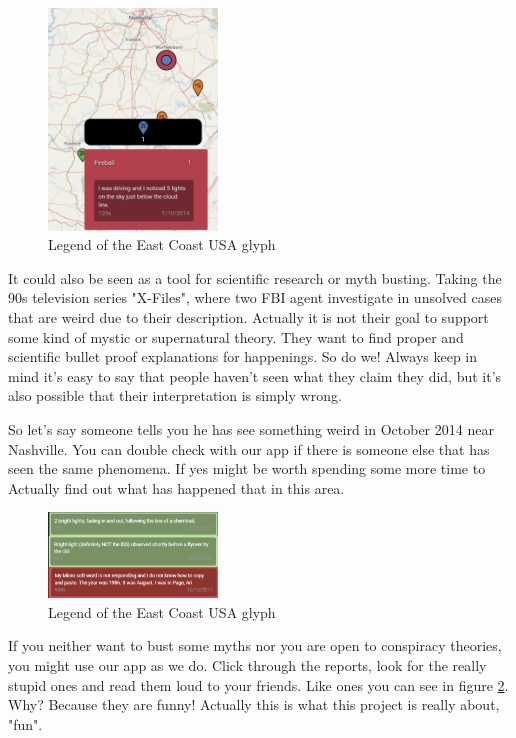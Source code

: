 \documentclass{article}
\begin{document}
\newpage

\begin{figure} 
    \centering
    \includegraphics[width=0.4\textwidth]{Tennesee}
    \caption{Legend of the East Coast USA glyph}
    \label{fig:Tennesee}
\end{figure}

It could also be seen as a tool for scientific research or myth busting. Taking the 90s television series "X-Files", where two FBI agent investigate in unsolved cases that are weird due to their description. Actually it is not their goal to support some kind of mystic or supernatural theory.
They want to find proper and scientific bullet proof explanations for happenings. So do we! Always keep in mind it's easy to say that people haven't seen what they claim they did, but it's also possible that their interpretation is simply wrong.

So let's say someone tells you he has see something weird in October 2014 near Nashville. You can double check with our app
if there is someone else that has seen the same phenomena. If yes might be worth spending some more time to Actually find out
what has happened that in this area.\\

\begin{figure} 
    \centering
    \includegraphics[width=0.4\textwidth]{funnyFindings}
    \caption{Legend of the East Coast USA glyph}
    \label{fig:funnyFindings}
\end{figure}

If you neither want to bust some myths nor you are open to conspiracy theories, 
you might use our app as we do. Click through the reports, look for the really 
stupid ones and read them loud to your friends. Like ones you can see in figure \ref{fig:funnyFindings}.
 Why? Because they are funny! Actually this is what this project is really about, "fun".
\end{document}
